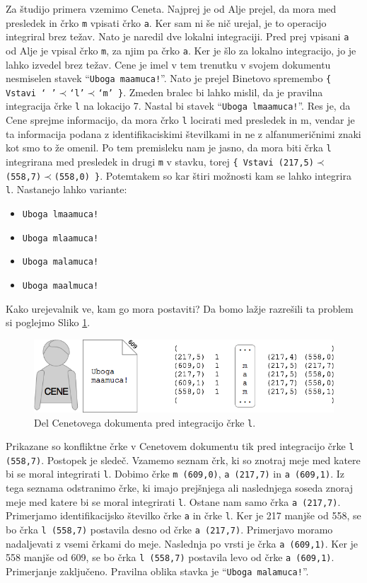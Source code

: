 \documentclass[a4paper, 12pt, twoside]{book}
\begin{document}
Za študijo primera vzemimo Ceneta. Najprej je od Alje prejel, da mora med presledek in črko {\tt m} vpisati črko {\tt a}. Ker sam ni še nič urejal, je to operacijo integriral brez težav. Nato je naredil dve lokalni integraciji. Pred prej vpisani {\tt a} od Alje je vpisal črko {\tt m}, za njim pa črko {\tt a}. Ker je šlo za lokalno integracijo, jo je lahko izvedel brez težav. Cene je imel v tem trenutku v svojem dokumentu nesmiselen stavek “{\tt Uboga maamuca!}”. Nato je prejel Binetovo spremembo {\tt \{ Vstavi ‘ ’$\prec$‘l’$\prec$‘m’ \}}. Zmeden bralec bi lahko mislil, da je pravilna integracija črke {\tt l} na lokacijo 7. Nastal bi stavek “{\tt Uboga lmaamuca!}”. Res je, da Cene sprejme informacijo, da mora črko {\tt l} locirati med presledek in m, vendar je ta informacija podana z identifikaciskimi številkami in ne z alfanumeričnimi znaki kot smo to že omenil. Po tem premisleku nam je jasno, da mora biti črka {\tt l} integrirana med presledek in drugi {\tt m} v stavku, torej {\tt \{ Vstavi (217,5)$\prec$(558,7)$\prec$(558,0) \}}. Potemtakem so kar štiri možnosti kam se lahko integrira {\tt l}. Nastanejo lahko variante:

\begin{itemize}
	\item {\tt Uboga lmaamuca!}
	\item {\tt Uboga mlaamuca!}
	\item {\tt Uboga malamuca!}
	\item {\tt Uboga maalmuca!}
\end{itemize}

Kako urejevalnik ve, kam go mora postaviti? Da bomo lažje razrešili ta problem si poglejmo Sliko \ref{woot7}.

\begin{figure}[placement h]
\begin{center}
\includegraphics[width=13cm]{woot7.png}
\end{center}
\caption{Del Cenetovega dokumenta pred integracijo črke {\tt l}.}
\label{woot7}
\end{figure}

Prikazane so konfliktne črke v Cenetovem dokumentu tik pred integracijo črke {\tt l (558,7)}. Postopek je sledeč. Vzamemo seznam črk, ki so znotraj meje med katere bi se moral integrirati {\tt l}. Dobimo črke {\tt m (609,0)}, {\tt a (217,7)} in {\tt a (609,1)}. Iz tega seznama odstranimo črke, ki imajo prejšnjega ali naslednjega soseda znoraj meje med katere bi se moral integrirati {\tt l}. Ostane nam samo črka {\tt a (217,7)}. Primerjamo identifikacijsko številko črke {\tt a} in črke {\tt l}. Ker je 217 manjše od 558, se bo črka {\tt l (558,7)} postavila desno od črke {\tt a (217,7)}. Primerjavo moramo nadaljevati z vsemi črkami do meje. Naslednja po vrsti je črka {\tt a (609,1)}. Ker je 558 manjše od 609, se bo črka {\tt l (558,7)} postavila levo od črke {\tt a (609,1)}. Primerjanje zaključeno. Pravilna oblika stavka je “{\tt Uboga malamuca!}”.
\end{document}
